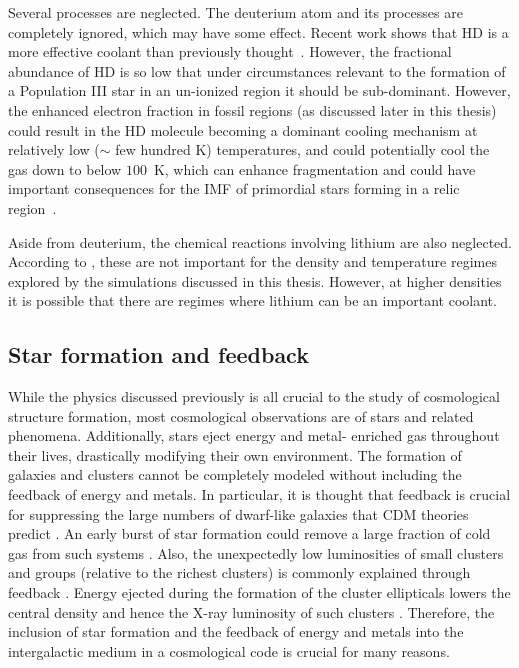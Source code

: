 Several processes are neglected.  The deuterium atom and its processes are 
completely ignored, which may have some effect.  Recent work shows that HD is
a more effective coolant than previously thought~\citep{2005MNRAS.361..850L}.  However,
the fractional abundance of HD is so low that under circumstances relevant to
the formation of a Population III star in an un-ionized region it should be
sub-dominant.  However, the enhanced electron fraction in fossil 
 regions (as discussed later in this thesis) could result in the HD molecule
becoming a dominant cooling mechanism at relatively low ($\sim$ few hundred K)
temperatures, and could potentially cool the gas down to below $100$~K, which can
enhance fragmentation and could have important consequences for the IMF of 
primordial stars forming in a relic  region~\citep{2005MNRAS.364.1378N}.

Aside from deuterium, the chemical reactions involving lithium 
are also neglected.  According to \citet{1998A&A...335..403G}, these are 
not important for the density and temperature regimes explored 
by the simulations discussed in this thesis.  However, at higher densities it 
is possible that there are regimes where lithium can be an important coolant.


\subsection{Star formation and feedback}\label{sec.ov.star}


While the physics discussed previously is all crucial to the study of
cosmological structure formation, most cosmological observations are of
stars and related phenomena.  Additionally, stars eject energy and metal-
enriched gas throughout their lives, drastically modifying their own 
environment.  The formation of galaxies and clusters cannot be completely
modeled without including the feedback of energy and metals.  In particular,
it is thought that feedback is crucial for suppressing the large numbers of
dwarf-like galaxies that CDM theories predict 
\citep{1991ApJ...381...14L,1991ApJ...379...52W}.  An early
burst of star formation could remove a large fraction of cold gas from such systems
\citep{1978MNRAS.183..341W,1991ApJ...367...45C}.  Also, the unexpectedly 
low luminosities of small clusters and
groups (relative to the richest clusters) is commonly explained through feedback
\citep{1991ApJ...383..104K}.  Energy ejected during the formation of the cluster ellipticals 
lowers the central density and hence the X-ray luminosity of such clusters 
 \citep{1997ApJ...484L..21C}.  Therefore, the inclusion of star formation and the 
feedback of energy and metals into the intergalactic medium in a cosmological
code is crucial for many reasons.  

